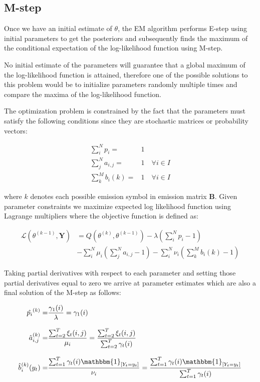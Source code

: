 \subsection*{M-step}

Once we have an initial estimate of $\theta$, the EM algorithm performs E-step using initial parameters to get the posteriors and 
subsequently finds the maximum of the conditional expectation of the log-likelihood function using M-step. 

No initial estimate of the parameters will guarantee that a global maximum of the log-likelihood function is attained, therefore one of the possible
solutions to this problem would be to initialize parameters randomly multiple times and compare the maxima of the log-likelihood function. 

The optimization problem is constrained by the fact that the parameters must satisfy the following conditions 
since they are stochastic matrices or probability vectors:

\begin{align}
\sum_i^N p_i =& 1 \\
\sum_j^N a_{i,j} =& 1 \quad  \forall i \in I \\
\sum_k^M b_{i}(k) =& 1 \quad \forall i \in I
\end{align}

where $k$ denotes each possible emission symbol in emission matrix $\textbf{B}$. Given parameter constraints we maximize 
expected log likelihood function using Lagrange multipliers where the objective function is defined as:

\begin{align}
\mathcal{L}(\theta^{(k-1)},\textbf{Y}) &= Q(\theta^{(k)}, \theta^{(k-1)}) - \lambda(\sum_i^N p_i - 1) \\ \nonumber
& - \sum_i^N \mu_i (\sum_j^N a_{i,j} -  1)  - \sum_i^N \nu_i (\sum_k^M b_{i}(k) - 1)
\end{align}

 Taking partial derivatives with respect to each parameter and setting those partial derivatives equal to zero we arrive at 
 parameter estimates which are also a final solution of the M-step as follows:

\begin{align}
\hat{p_i}^{(k)} = & \frac{\gamma_1(i)}{\lambda} = \gamma_1(i) \\[0.3cm]
\hat{a}_{i,j}^{(k)} = & \frac{\sum_{t=2}^{T} \xi_t (i,j)}{\mu_i} = \frac{\sum_{t=2}^{T} \xi_t (i,j)}{\sum_{t=2}^{T} \gamma_t (i)} \\[0.3cm]
\hat{b}_{i}^{(k)}(y_t) = & \frac{\sum_{t=1}^{T} \gamma_t (i) \mathbbm{1}_{[Y_t = y_t ]}}{\nu_i} = \frac{ \sum_{t=1}^{T} \gamma_t (i) \mathbbm{1}_{[Y_t = y_t ]}}{\sum_{t=1}^{T} \gamma_t (i)} 
\end{align}

